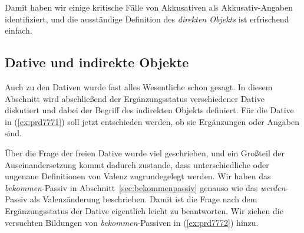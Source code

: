 \begin{exe}
  \ex\label{ex:prd8282}
  \begin{xlist}
  \end{xlist} 
\end{exe}

Damit haben wir einige kritische Fälle von Akkusativen als Akkusativ-Angaben identifiziert, und die ausständige Definition des \textit{direkten Objekts} ist erfrischend einfach.


\subsection{Dative und indirekte Objekte}

\label{sec:dativobjekte}

Auch zu den Dativen wurde fast alles Wesentliche schon gesagt.
In diesem Abschnitt wird abschließend der Ergänzungsstatus verschiedener Dative diskutiert und dabei der Begriff des indirekten Objekts definiert.
Für die Dative in (\ref{ex:prd7771}) soll jetzt entschieden werden, ob sie Ergänzungen oder Angaben sind.

\begin{exe}
  \ex\label{ex:prd7771} 
  \begin{xlist}
  \end{xlist}
\end{exe}


Über die Frage der freien Dative wurde viel geschrieben, und ein Großteil der Auseinandersetzung kommt dadurch zustande, dass unterschiedliche oder ungenaue Definitionen von Valenz zugrundegelegt werden.
Wir haben das \textit{bekommen}-Passiv in Abschnitt~\ref{sec:bekommenpassiv} genauso wie das \textit{werden}-Passiv als Valenzänderung beschrieben.
Damit ist die Frage nach dem Ergänzungsstatus der Dative eigentlich leicht zu beantworten.
Wir ziehen die versuchten Bildungen von \textit{bekommen}-Passiven in (\ref{ex:prd7772}) hinzu.

